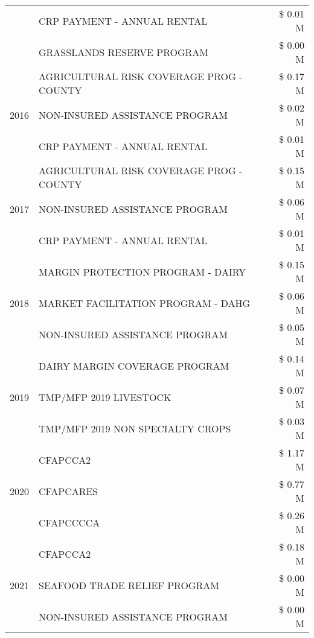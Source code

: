 \begin{tabular}{llr}
 & CRP PAYMENT - ANNUAL RENTAL & \$ 0.01 M \\
 & GRASSLANDS RESERVE PROGRAM & \$ 0.00 M \\
\cline{1-3}
\multirow[t]{3}{*}{2016} & AGRICULTURAL RISK COVERAGE PROG - COUNTY & \$ 0.17 M \\
 & NON-INSURED ASSISTANCE PROGRAM & \$ 0.02 M \\
 & CRP PAYMENT - ANNUAL RENTAL & \$ 0.01 M \\
\cline{1-3}
\multirow[t]{3}{*}{2017} & AGRICULTURAL RISK COVERAGE PROG - COUNTY & \$ 0.15 M \\
 & NON-INSURED ASSISTANCE PROGRAM & \$ 0.06 M \\
 & CRP PAYMENT - ANNUAL RENTAL & \$ 0.01 M \\
\cline{1-3}
\multirow[t]{3}{*}{2018} & MARGIN PROTECTION PROGRAM - DAIRY & \$ 0.15 M \\
 & MARKET FACILITATION PROGRAM - DAHG & \$ 0.06 M \\
 & NON-INSURED ASSISTANCE PROGRAM & \$ 0.05 M \\
\cline{1-3}
\multirow[t]{3}{*}{2019} & DAIRY MARGIN COVERAGE PROGRAM & \$ 0.14 M \\
 & TMP/MFP 2019 LIVESTOCK & \$ 0.07 M \\
 & TMP/MFP 2019 NON SPECIALTY CROPS & \$ 0.03 M \\
\cline{1-3}
\multirow[t]{3}{*}{2020} & CFAPCCA2 & \$ 1.17 M \\
 & CFAPCARES & \$ 0.77 M \\
 & CFAPCCCCA & \$ 0.26 M \\
\cline{1-3}
\multirow[t]{3}{*}{2021} & CFAPCCA2 & \$ 0.18 M \\
 & SEAFOOD TRADE RELIEF PROGRAM & \$ 0.00 M \\
 & NON-INSURED ASSISTANCE PROGRAM & \$ 0.00 M \\
\cline{1-3}
\bottomrule
\end{tabular}
